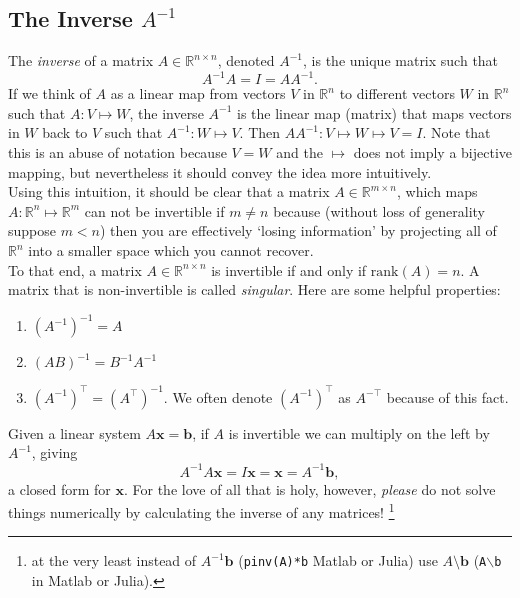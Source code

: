 \documentclass{article}
\newcommand{\1}{\mathbf{1}}
\newcommand{\0}{\mathbf{0}}
\newcommand{\xx}{\mathbf{x}}
\newcommand{\bb}{\mathbf{b}}
\newcommand{\RR}{\mathbb{R}}
\newcommand{\T}{\top}
\newcommand{\rank}{\mathrm{rank}}
\begin{document}
\subsection{The Inverse $A^{-1}$}

The \textit{inverse} of a matrix $A\in\RR^{n\times n}$, denoted $A^{-1}$, is the unique matrix
such that
\[
    A^{-1}A = I = AA^{-1}.
\]
If we think of $A$ as a linear map from vectors $V$ in $\RR^n$ to different vectors $W$ in $\RR^n$
such that $A : V \mapsto W$, the inverse $A^{-1}$ is the linear map (matrix) that maps vectors in
$W$ back to $V$ such that $A^{-1}: W \mapsto V$. Then $AA^{-1}:V\mapsto W\mapsto V = I$.
Note that this is an abuse of notation because
$V=W$ and the $\mapsto$ does not imply a bijective mapping, but nevertheless it should convey the
idea more intuitively.\\

Using this intuition, it should be clear that a matrix $A\in\RR^{m\times n}$, which maps $A: \RR^n
\mapsto \RR^m$ can not be invertible if $m\neq n$ because (without loss of generality suppose $m < n$)
then you are effectively `losing information' by projecting all of $\RR^n$ into a smaller space which
you cannot recover.\\

To that end, a matrix $A\in\RR^{n\times n}$ is invertible if and only if $\rank(A) = n$. A matrix that
is non-invertible is called \textit{singular}. Here are some helpful properties:
\begin{enumerate}
\item $(A^{-1})^{-1} = A$
\item $(AB)^{-1} = B^{-1}A^{-1}$
\item $(A^{-1})^\T = (A^\T)^{-1}$. We often denote $(A^{-1})^\T$ as $A^{-\T}$ because
    of this fact.\\
\end{enumerate}

Given a linear system $A\xx=\bb$, if $A$ is invertible we can multiply on
the left by $A^{-1}$, giving
\[
    A^{-1}A\xx = I\xx = \xx = A^{-1}\bb,
\]
a closed form for $\xx$. For the love of all that is holy, however, \textit{please} do
not solve things numerically by calculating the inverse of any matrices!
\footnote{at the very least instead of $A^{-1}\bb$ (\texttt{pinv(A)*b} Matlab or Julia) use $A\setminus\bb$
(\texttt{A$\backslash$b} in Matlab or Julia).}
\end{document}
